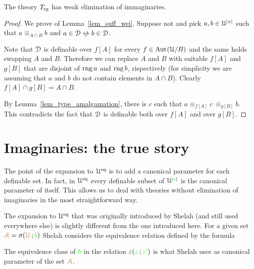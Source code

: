 \documentclass[creche.tex]{subfiles}
\begin{document}
\begin{lemma}
  The theory $T_{\rm rg}$ has weak elimination of immaginaries.
\end{lemma}

\begin{proof}
  We prove {\natural} of Lemma~\ref{lem_suff_wei}.
  Suppose not and pick $a,b\in\EuScript U^{|x|}$ such that $a\equiv_{A\cap B}b$ and $a\in\D\niff b\in\D$.


  Note that $\EuScript D$ is definable over $f[A]$ for every $f\in{\rm Aut\kern.15ex}(\EuScript U/B)$ and the same holds swapping $A$ and $B$.
  Therefore we can replace $A$ and $B$ with suitable $f[A]$ and $g[B]$ that are disjoint of $\mathop{\rm rng} a$ and $\mathop{\rm rng} b$, rispectively (for simplicity we are assuming that $a$ and $b$ do not contain elements in $A\cap B$).
  Clearly $f[A]\cap g[B]=A\cap B$.

  By Lemma~\ref{lem_type_amalgamation}, there is $c$ such that $a\equiv_{f[A]} c\,\equiv_{g[B]} b$.
  This contradicts the fact that $\EuScript D$ is definable both over $f[A]$ and over $g[B]$.
\end{proof}



\section{Imaginaries: the true story}\label{imaginaries_long}

The point of the expansion to $\EuScript U^{{\rm eq}}$ is to add a canonical parameter for each definable set.
In fact, in $\EuScript U^{{\rm eq}}$ every definable subset of $\EuScript U^{|{\color{green} z}|}$ is the canonical parameter of itself.
This allows us to deal with theories without elimination of imaginaries in the most straightforward way.

The expansion to $\EuScript U^{{\rm eq}}$ that was originally introduced by Shelah (and still used everywhere else) is slightly different from the one introduced here.
For a given set ${\color{brown}\EuScript A}=\sigma({\color{brown}\EuScript U}\,;{\color{green} b})$ Shelah considers the equivalence relation defined by the formula


The equivalence class of ${\color{green} b}$ in the relation $\varepsilon({\color{green} z}\,;{\color{green} z'})$ is what Shelah uses as canonical parameter of the set ${\color{brown}\EuScript A}$.
\end{document}
